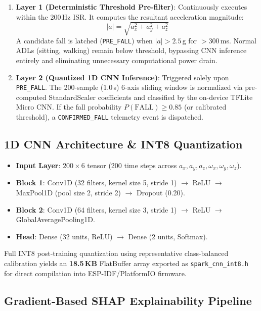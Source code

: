 \begin{enumerate}
    \item \textbf{Layer 1 (Deterministic Threshold Pre-filter)}: Continuously executes within the 200\,Hz ISR. It computes the resultant acceleration magnitude:
          \begin{equation}
              |a| = \sqrt{a_x^2 + a_y^2 + a_z^2}
          \end{equation}
          A candidate fall is latched (\texttt{PRE\_FALL}) when \(|a| > 2.5\)\,g for \(>300\)\,ms. Normal ADLs (sitting, walking) remain below threshold, bypassing CNN inference entirely and eliminating unnecessary computational power drain.
    \item \textbf{Layer 2 (Quantized 1D CNN Inference)}: Triggered solely upon \texttt{PRE\_FALL}. The 200-sample (\(1.0\)\,s) 6-axis sliding window is normalized via pre-computed StandardScaler coefficients and classified by the on-device TFLite Micro CNN. If the fall probability \(P(\text{FALL}) \ge 0.85\) (or calibrated threshold), a \texttt{CONFIRMED\_FALL} telemetry event is dispatched.
\end{enumerate}

\subsection{1D CNN Architecture \& INT8 Quantization}

\begin{itemize}
    \item \textbf{Input Layer}: \(200 \times 6\) tensor (200 time steps across \(a_x, a_y, a_z, \omega_x, \omega_y, \omega_z\)).
    \item \textbf{Block 1}: Conv1D (32 filters, kernel size 5, stride 1) \(\rightarrow\) ReLU \(\rightarrow\) MaxPool1D (pool size 2, stride 2) \(\rightarrow\) Dropout (0.20).
    \item \textbf{Block 2}: Conv1D (64 filters, kernel size 3, stride 1) \(\rightarrow\) ReLU \(\rightarrow\) GlobalAveragePooling1D.
    \item \textbf{Head}: Dense (32 units, ReLU) \(\rightarrow\) Dense (2 units, Softmax).
\end{itemize}
Full INT8 post-training quantization using representative class-balanced calibration yields an \textbf{18.5\,KB} FlatBuffer array exported as \texttt{spark\_cnn\_int8.h} for direct compilation into ESP-IDF/PlatformIO firmware.

\subsection{Gradient-Based SHAP Explainability Pipeline}

